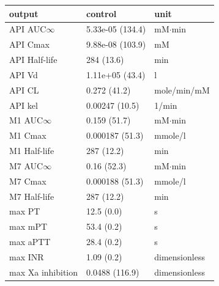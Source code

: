 \begin{tabular}{lll}
\toprule
output & control & unit \\
\midrule
API AUC$\infty$ & 5.33e-05 (134.4) & mM$\cdot$min \\
API Cmax & 9.88e-08 (103.9) & mM \\
API Half-life & 284 (13.6) & min \\
API Vd & 1.11e+05 (43.4) & l \\
API CL & 0.272 (41.2) & mole/min/mM \\
API kel & 0.00247 (10.5) & 1/min \\
M1 AUC$\infty$ & 0.159 (51.7) & mM$\cdot$min \\
M1 Cmax & 0.000187 (51.3) & mmole/l \\
M1 Half-life & 287 (12.2) & min \\
M7 AUC$\infty$ & 0.16 (52.3) & mM$\cdot$min \\
M7 Cmax & 0.000188 (51.3) & mmole/l \\
M7 Half-life & 287 (12.2) & min \\
max PT & 12.5 (0.0) & s \\
max mPT & 53.4 (0.2) & s \\
max aPTT & 28.4 (0.2) & s \\
max INR & 1.09 (0.2) & dimensionless \\
max Xa inhibition & 0.0488 (116.9) & dimensionless \\
\bottomrule
\end{tabular}
